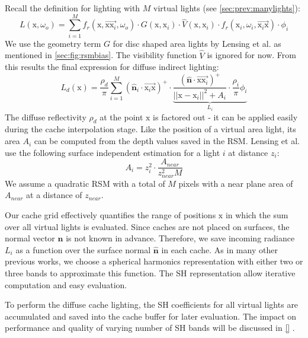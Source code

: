 \documentclass[thesis.tex]{subfiles}
\begin{document}
Recall the definition for lighting with $M$ virtual lights (see \autoref{sec:prev:manylights}):
\begin{equation}
L(\mathrm{x}, \omega_o) = \sum\limits_{i=1}^{M} f_r(\mathrm{x}, \overrightarrow{\mathrm{x}\mathrm{x}_i}, \omega_o) \cdot G(\mathrm{x}, \mathrm{x}_i) \cdot \hat{V}(\mathrm{x}, \mathrm{x}_i) \cdot f_r(\mathrm{x}_i, \omega_i, \overrightarrow{\mathrm{x}_i\mathrm{x}}) \cdot \phi_i
\end{equation}
We use the geometry term $G$ for disc shaped area lights by Lensing et al. \cite{bib:LightskinPaper} as mentioned in \autoref{sec:fig:rsmbias}.
The visibility function $\hat{V}$ is ignored for now.
From this results the final expression for diffuse indirect lighting:
\begin{equation} \label{eq:rsmdiffuse}
L_d (\mathrm{x}) = \frac{\rho_d}{\pi} \sum\limits_{i=1}^{M} 
(\hat{\mathbf{n}}_i\cdot \overrightarrow{\mathrm{x}_i\mathrm{x}})^+ \cdot
\underbrace{\frac{(\hat{\mathbf{n}} \cdot \overrightarrow{\mathrm{x}\mathrm{x}_i} )^+}{||\mathrm{x} - \mathrm{x}_i||^2 + A_i} \cdot  \frac{\rho_i}{\pi} \phi_i}_{L_i}
\end{equation}
The diffuse reflectivity $\rho_d$ at the point $\mathrm{x}$ is factored out - it can be applied easily during the cache interpolation stage.
Like the position of a virtual area light, its area $A_i$ can be computed from the depth values saved in the RSM.
Lensing et al. \cite{bib:LightskinPaper} use the following surface independent estimation for a light $i$ at distance $z_i$:
\begin{equation}
A_i = z_i^2 \cdot \frac{A_{near}}{z_{near}^2 M}
\end{equation}
We assume a quadratic RSM with a total of $M$ pixels with a near plane area of $A_{near}$ at a distance of $z_{near}$.

Our cache grid effectively quantifies the range of positions $\mathrm{x}$ in which the sum over all virtual lights is evaluated.
Since caches are not placed on surfaces, the normal vector $\hat{\mathbf{n}}$ is not known in advance.
Therefore, we save incoming radiance $L_i$ as a function over the surface normal $\hat{\mathbf{n}}$ in each cache.
As in many other previous works, we choose a spherical harmonics representation with either two or three bands to approximate this function.
The SH representation allow iterative computation and easy evaluation.

To perform the diffuse cache lighting, the SH coefficients for all virtual lights are accumulated and saved into the cache buffer for later evaluation.
The impact on performance and quality of varying number of SH bands will be discussed in \autoref{} .
\end{document}
